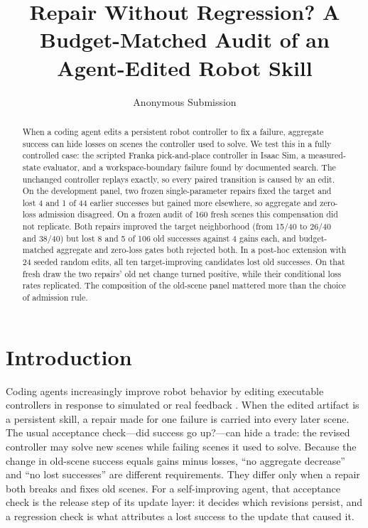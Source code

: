 \documentclass[letterpaper]{article} %
\title{Repair Without Regression? A Budget-Matched Audit of an Agent-Edited Robot Skill}
\author{
    Anonymous Submission
}
\begin{document}
\maketitle

\begin{abstract}
When a coding agent edits a persistent robot controller to fix a failure, aggregate success can hide losses on scenes the controller used to solve. We test this in a fully controlled case: the scripted Franka pick-and-place controller in Isaac Sim, a measured-state evaluator, and a workspace-boundary failure found by documented search. The unchanged controller replays exactly, so every paired transition is caused by an edit. On the development panel, two frozen single-parameter repairs fixed the target and lost 4 and 1 of 44 earlier successes but gained more elsewhere, so aggregate and zero-loss admission disagreed. On a frozen audit of 160 fresh scenes this compensation did not replicate. Both repairs improved the target neighborhood (from 15/40 to 26/40 and 38/40) but lost 8 and 5 of 106 old successes against 4 gains each, and budget-matched aggregate and zero-loss gates both rejected both. In a post-hoc extension with 24 seeded random edits, all ten target-improving candidates lost old successes. On that fresh draw the two repairs' old net change turned positive, while their conditional loss rates replicated. The composition of the old-scene panel mattered more than the choice of admission rule.
\end{abstract}

\section{Introduction}
Coding agents increasingly improve robot behavior by editing executable controllers in response to simulated or real feedback \citep{kuroki2026closedloop,xiao2026enpire,aphale2026selfrepair}. When the edited artifact is a persistent skill, a repair made for one failure is carried into every later scene. The usual acceptance check---did success go up?---can hide a trade: the revised controller may solve new scenes while failing scenes it used to solve. Because the change in old-scene success equals gains minus losses, ``no aggregate decrease'' and ``no lost successes'' are different requirements. They differ only when a repair both breaks and fixes old scenes. For a self-improving agent, that acceptance check is the release step of its update layer: it decides which revisions persist, and a regression check is what attributes a lost success to the update that caused it.
\end{document}
